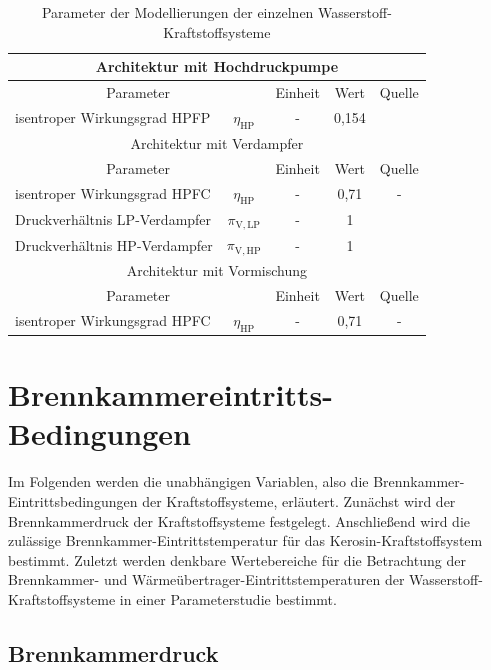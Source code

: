 \begin{table}[ht]
	\centering
	\caption{Parameter der Modellierungen der einzelnen Wasserstoff-Kraftstoffsysteme}
	\begin{tabular} {|l|c|c|c|c|} \hline%
		\multicolumn{5}{|c|}{Architektur mit Hochdruckpumpe}\\ \hline
		\multicolumn{2}{|c|}{Parameter} & Einheit & Wert & Quelle\\ \hline\hline%
		isentroper Wirkungsgrad HPFP & $\eta_\mathrm{HP}$ & - & 0,154 & \cite{Brewer.1991} \\ \hline
		\multicolumn{5}{|c|}{Architektur mit Verdampfer}\\ \hline
		\multicolumn{2}{|c|}{Parameter} & Einheit & Wert & Quelle\\ \hline\hline%
		isentroper Wirkungsgrad HPFC & $\eta_\mathrm{HP}$ & - & 0,71 & - \\ \hline
		Druckverhältnis LP-Verdampfer & $\pi_\mathrm{V,LP}$ & - & 1 & \cite{Sciatti.2025} \\ \hline
		Druckverhältnis HP-Verdampfer & $\pi_\mathrm{V,HP}$ & - & 1 & \cite{Sciatti.2025} \\ \hline\hline
		\multicolumn{5}{|c|}{Architektur mit Vormischung}\\ \hline
		\multicolumn{2}{|c|}{Parameter} & Einheit & Wert & Quelle\\ \hline\hline%
		isentroper Wirkungsgrad HPFC & $\eta_\mathrm{HP}$ & - & 0,71 & - \\ \hline
	\end{tabular}	
	\label{Tab:h2_param2}%
\end{table}
\FloatBarrier 

\section{Brennkammereintritts-Bedingungen}

Im Folgenden werden die unabhängigen Variablen, also die Brennkammer-Eintrittsbedingungen der Kraftstoffsysteme, erläutert. Zunächst wird der Brennkammerdruck der Kraftstoffsysteme festgelegt. Anschließend wird die zulässige Brennkammer-Eintrittstemperatur für das Kerosin-Kraftstoffsystem bestimmt. Zuletzt werden denkbare Wertebereiche für die Betrachtung der Brennkammer- und Wärmeübertrager-Eintrittstemperaturen der Wasserstoff-Kraftstoffsysteme in einer Parameterstudie bestimmt.

\subsection{Brennkammerdruck}

